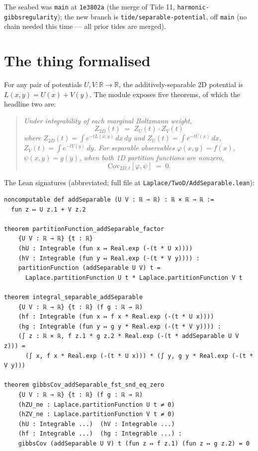 \documentclass[11pt]{article}
\begin{document}
The seabed was \texttt{main} at \texttt{1e3802a} (the merge of Tide 11,
\texttt{harmonic-gibbsregularity}); the new branch is
\texttt{tide/separable-potential}, off \texttt{main} (no chain needed
this time --- all prior tides are merged).

\section{The thing formalised}

For any pair of potentials $U, V : \mathbb{R} \to \mathbb{R}$, the
additively-separable 2D potential is $L(x, y) = U(x) + V(y)$. The
module exposes five theorems, of which the headline two are:

\begin{quote}\itshape
Under integrability of each marginal Boltzmann weight,
\[
  Z_{2D}(t) \;=\; Z_U(t) \cdot Z_V(t)
\]
where $Z_{2D}(t) = \int e^{-tL(x,y)}\,dx\,dy$ and $Z_U(t) = \int
e^{-tU(x)}\,dx$, $Z_V(t) = \int e^{-tV(y)}\,dy$. For separable
observables $\varphi(x, y) = f(x)$, $\psi(x, y) = g(y)$, when both
1D partition functions are nonzero,
\[
  \mathrm{Cov}_{2D, t}[\varphi, \psi] \;=\; 0.
\]
\end{quote}

\noindent The Lean signatures (abbreviated; full file at
\texttt{Laplace/TwoD/AddSeparable.lean}):

\begin{verbatim}
noncomputable def addSeparable (U V : ℝ → ℝ) : ℝ × ℝ → ℝ :=
  fun z ↦ U z.1 + V z.2

theorem partitionFunction_addSeparable_factor
    {U V : ℝ → ℝ} {t : ℝ}
    (hU : Integrable (fun x ↦ Real.exp (-(t * U x))))
    (hV : Integrable (fun y ↦ Real.exp (-(t * V y)))) :
    partitionFunction (addSeparable U V) t =
      Laplace.partitionFunction U t * Laplace.partitionFunction V t

theorem integral_separable_addSeparable
    {U V : ℝ → ℝ} {t : ℝ} (f g : ℝ → ℝ)
    (hf : Integrable (fun x ↦ f x * Real.exp (-(t * U x))))
    (hg : Integrable (fun y ↦ g y * Real.exp (-(t * V y)))) :
    (∫ z : ℝ × ℝ, f z.1 * g z.2 * Real.exp (-(t * addSeparable U V z))) =
      (∫ x, f x * Real.exp (-(t * U x))) * (∫ y, g y * Real.exp (-(t * V y)))

theorem gibbsCov_addSeparable_fst_snd_eq_zero
    {U V : ℝ → ℝ} {t : ℝ} (f g : ℝ → ℝ)
    (hZU_ne : Laplace.partitionFunction U t ≠ 0)
    (hZV_ne : Laplace.partitionFunction V t ≠ 0)
    (hU : Integrable ...)  (hV : Integrable ...)
    (hf : Integrable ...)  (hg : Integrable ...) :
    gibbsCov (addSeparable U V) t (fun z ↦ f z.1) (fun z ↦ g z.2) = 0
\end{verbatim}
\end{document}
